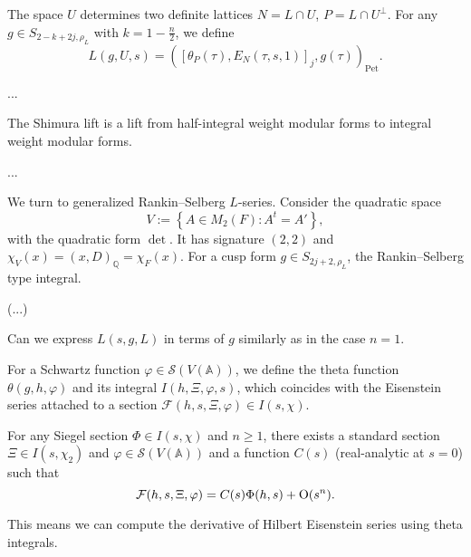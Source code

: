 \documentclass[reqno]{amsart} 
\begin{document}
The space $U$ determines two definite lattices $N = L \cap U$, $P = L \cap U^\perp$.  For any $g \in S_{2 - k + 2 j, \rho_L}$ with $k = 1 - \tfrac{n}{2}$, we define
\begin{equation*}
  L(g, U, s) = \left([\theta_P(\tau), E_N(\tau, s, 1)]_j, g(\tau) \right)_{\mathrm{Pet}}.
\end{equation*}

\begin{theorem}[Bruinier et al]
  ...
\end{theorem}

The Shimura lift is a lift from half-integral weight modular forms to integral weight modular forms.

\begin{theorem}
  ...
\end{theorem}

We turn to generalized Rankin--Selberg $L$-series.  Consider the quadratic space
\begin{equation*}
  V := \left\{ A \in M_2(F) : A^t = A' \right\},
\end{equation*}
with the quadratic form $\det$.  It has signature $(2, 2)$ and $\chi_V(x) =(x, D)_{\mathbb{Q}} = \chi_F(x)$.  For a cusp form $g \in S_{2 j + 2, \rho_L}$, the Rankin--Selberg type integral.

(...)

\begin{question}
  Can we express $L(s, g, L)$ in terms of $g$ similarly as in the case $n = 1$.
\end{question}

For a Schwartz function $\varphi \in \mathcal{S}(V(\mathbb{A}))$, we define the theta function $\theta(g, h, \varphi)$ and its integral $I(h, \Xi, \varphi, s)$, which coincides with the Eisenstein series attached to a section $\mathcal{F}(h, s, \Xi, \varphi) \in I(s, \chi)$.

\begin{theorem}[M.\ and Y.\ '24]
  For any Siegel section $\Phi \in I(s, \chi)$ and $n \geq 1$, there exists a standard section $\Xi \in I(s, \chi_2)$ and $\varphi \in \mathcal{S}(V(\mathbb{A}))$ and a function $C(s)$ (real-analytic at $s =0$) such that
  \begin{equation*}
    \mathcal{F}(h, s, \Xi, \varphi) = C(s) \Phi(h,s) + \operatorname{O}(s^n).
  \end{equation*}
\end{theorem}
This means we can compute the derivative of Hilbert Eisenstein series using theta integrals.
\end{document}
